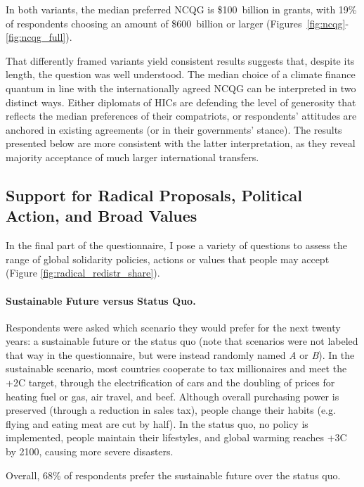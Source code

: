 \documentclass[12pt,english]{article}
\begin{document}
\begin{bibunit}
In both variants, the median preferred NCQG is \$100~billion in grants, with 19\% of respondents choosing an amount of \$600~billion or larger (Figures~\ref{fig:ncqg}-\ref{fig:ncqg_full}). 

That differently framed variants yield consistent results suggests that, despite its length, the question was well understood. 
The median choice of a climate finance quantum in line with the internationally agreed NCQG can be interpreted in two distinct ways. Either diplomats of HICs are defending the level of generosity that reflects the median preferences of their compatriots, or respondents' attitudes are anchored in existing agreements (or in their governments' stance). The results presented below are more consistent with the latter interpretation, as they reveal majority acceptance of much larger international transfers.


\subsection{Support for Radical Proposals, Political Action, and Broad Values}\label{subsec:radical}

In the final part of the questionnaire, I pose a variety of questions to assess the range of global solidarity policies, actions or values that people may accept (Figure \ref{fig:radical_redistr_share}).

\paragraph{Sustainable Future versus Status Quo.}\label{par:sustainable_future}

Respondents were asked which scenario they would prefer for the next twenty years: a sustainable future or the status quo (note that scenarios were not labeled that way in the questionnaire, but were instead randomly named \textit{A} or \textit{B}). In the sustainable scenario, most countries cooperate to tax millionaires and meet the +2\textdegree{}C target, through the electrification of cars and the doubling of prices for heating fuel or gas, air travel, and beef. Although overall purchasing power is preserved (through a reduction in sales tax), people change their habits (e.g. flying and eating meat are cut by half). In the status quo, no policy is implemented, people maintain their lifestyles, and global warming reaches +3\textdegree{}C by 2100, causing more severe disasters.

Overall, 68\% of respondents prefer the sustainable future over the status quo.


\end{bibunit}
\end{document}
